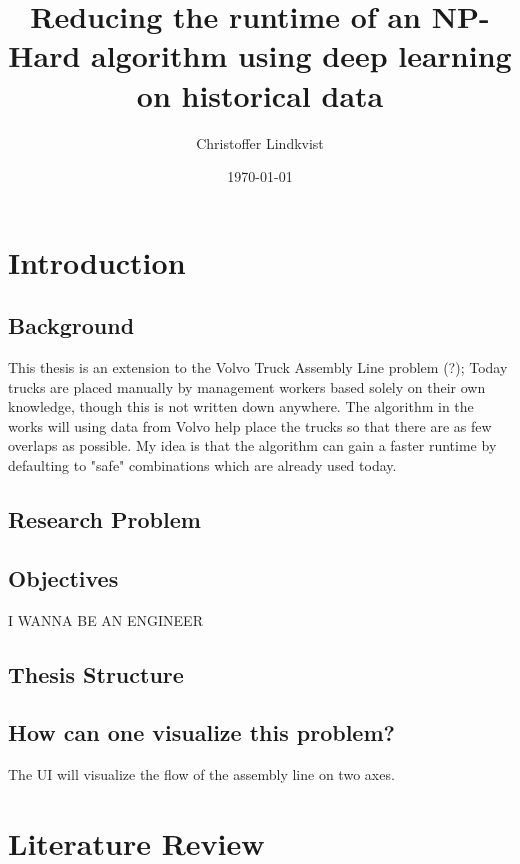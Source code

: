 \documentclass[12pt,a4paper]{report}
\begin{document}
\title{Reducing the runtime of an NP-Hard algorithm using deep learning on historical data}
\author{Christoffer Lindkvist}
\date{\today}
\maketitle

\begin{abstract}
\lipsum[1] 
\end{abstract}

\tableofcontents
\listoffigures
\listoftables

\chapter{Introduction}
\section{Background}
    This thesis is an extension to the Volvo Truck Assembly Line problem (?); 
    Today trucks are placed manually by management workers based solely on their own knowledge, 
    though this is not written down anywhere. 
    The algorithm in the works will using data from Volvo help place the trucks so that there are as few overlaps as possible. 
    My idea is that the algorithm can gain a faster runtime by defaulting to "safe" combinations which are already used today.
    
\section{Research Problem}
\section{Objectives}
    I WANNA BE AN ENGINEER
\section{Thesis Structure}
\section{How can one visualize this problem?}
    The UI will visualize the flow of the assembly line on two axes.

\chapter{Literature Review}
\end{document}
